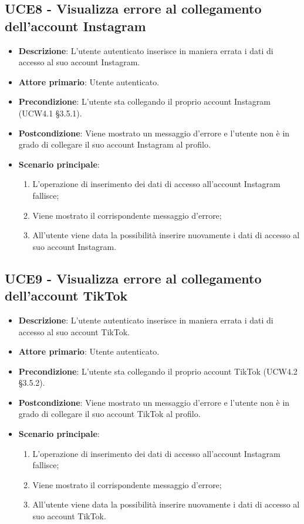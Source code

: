 \subsection{UCE8 - Visualizza errore al collegamento dell'account Instagram}
\begin{itemize}
\item \textbf{Descrizione}: L'utente autenticato inserisce in maniera errata i dati di accesso al suo account Instagram.
\item \textbf{Attore primario}: Utente autenticato.
\item \textbf{Precondizione}: L'utente sta collegando il proprio account Instagram (UCW4.1 §3.5.1).
\item \textbf{Postcondizione}: Viene mostrato un messaggio d'errore e l'utente non è in grado di collegare il suo account Instagram al profilo.

\item \textbf{Scenario principale}:
\begin{enumerate}
\item L'operazione di inserimento dei dati di accesso all'account Instagram fallisce;
\item Viene mostrato il corrispondente messaggio d'errore;
\item All'utente viene data la possibilità inserire nuovamente i dati di accesso al suo account Instagram.
\end{enumerate}
\end{itemize}

\subsection{UCE9 - Visualizza errore al collegamento dell'account TikTok}
\begin{itemize}
\item \textbf{Descrizione}: L'utente autenticato inserisce in maniera errata i dati di accesso al suo account TikTok.
\item \textbf{Attore primario}: Utente autenticato.
\item \textbf{Precondizione}: L'utente sta collegando il proprio account TikTok (UCW4.2 §3.5.2).
\item \textbf{Postcondizione}: Viene mostrato un messaggio d'errore e l'utente non è in grado di collegare il suo account TikTok al profilo.

\item \textbf{Scenario principale}:
\begin{enumerate}
\item L'operazione di inserimento dei dati di accesso all'account Instagram fallisce;
\item Viene mostrato il corrispondente messaggio d'errore;
\item All'utente viene data la possibilità inserire nuovamente i dati di accesso al suo account TikTok.
\end{enumerate}
\end{itemize}